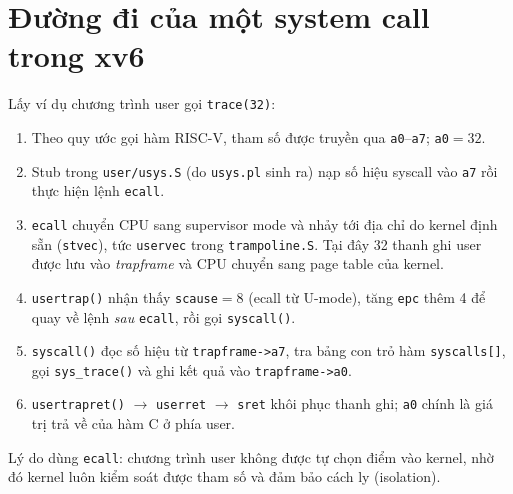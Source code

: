 \documentclass[12pt,a4paper]{article}
\newcommand{\code}[1]{\texttt{#1}}
\begin{document}
\section{Đường đi của một system call trong xv6}
Lấy ví dụ chương trình user gọi \code{trace(32)}:
\begin{enumerate}
  \item Theo quy ước gọi hàm RISC-V, tham số được truyền qua \code{a0}--\code{a7}; \code{a0}$=32$.
  \item Stub trong \code{user/usys.S} (do \code{usys.pl} sinh ra) nạp số hiệu syscall vào \code{a7} rồi thực hiện lệnh \code{ecall}.
  \item \code{ecall} chuyển CPU sang supervisor mode và nhảy tới địa chỉ do kernel định sẵn (\code{stvec}), tức \code{uservec} trong \code{trampoline.S}. Tại đây 32 thanh ghi user được lưu vào \emph{trapframe} và CPU chuyển sang page table của kernel.
  \item \code{usertrap()} nhận thấy \code{scause}$=8$ (ecall từ U-mode), tăng \code{epc} thêm 4 để quay về lệnh \emph{sau} \code{ecall}, rồi gọi \code{syscall()}.
  \item \code{syscall()} đọc số hiệu từ \code{trapframe->a7}, tra bảng con trỏ hàm \code{syscalls[]}, gọi \code{sys\_trace()} và ghi kết quả vào \code{trapframe->a0}.
  \item \code{usertrapret()} $\rightarrow$ \code{userret} $\rightarrow$ \code{sret} khôi phục thanh ghi; \code{a0} chính là giá trị trả về của hàm C ở phía user.
\end{enumerate}
Lý do dùng \code{ecall}: chương trình user không được tự chọn điểm vào kernel, nhờ đó kernel luôn kiểm soát được tham số và đảm bảo cách ly (isolation).

\end{document}
